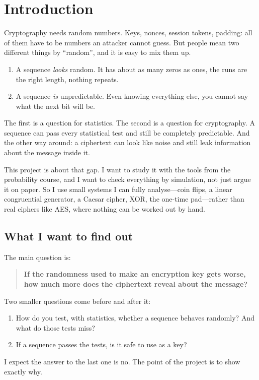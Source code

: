 
\section{Introduction}\label{sec:intro}

Cryptography needs random numbers. Keys, nonces, session tokens, padding:
all of them have to be numbers an attacker cannot guess. But people mean two
different things by ``random'', and it is easy to mix them up.
\begin{enumerate}
  \item A sequence \emph{looks} random. It has about as many zeros as ones,
        the runs are the right length, nothing repeats.
  \item A sequence \emph{is} unpredictable. Even knowing everything else, you
        cannot say what the next bit will be.
\end{enumerate}
The first is a question for statistics. The second is a question for
cryptography. A sequence can pass every statistical test and still be
completely predictable. And the other way around: a ciphertext can look like
noise and still leak information about the message inside it.

This project is about that gap. I want to study it with the tools from the
probability course, and I want to check everything by simulation, not just
argue it on paper. So I use small systems I can fully analyse---coin flips, a
linear congruential generator, a Caesar cipher, XOR, the one-time pad---rather
than real ciphers like AES, where nothing can be worked out by hand.

\subsection{What I want to find out}\label{sec:questions}

The main question is:
\begin{quote}
  \textbf{If the randomness used to make an encryption key gets worse, how
  much more does the ciphertext reveal about the message?}
\end{quote}
Two smaller questions come before and after it:
\begin{enumerate}
  \item How do you test, with statistics, whether a sequence behaves
        randomly? And what do those tests miss?
  \item If a sequence passes the tests, is it safe to use as a key?
\end{enumerate}
I expect the answer to the last one is no. The point of the project is to
show exactly why.

